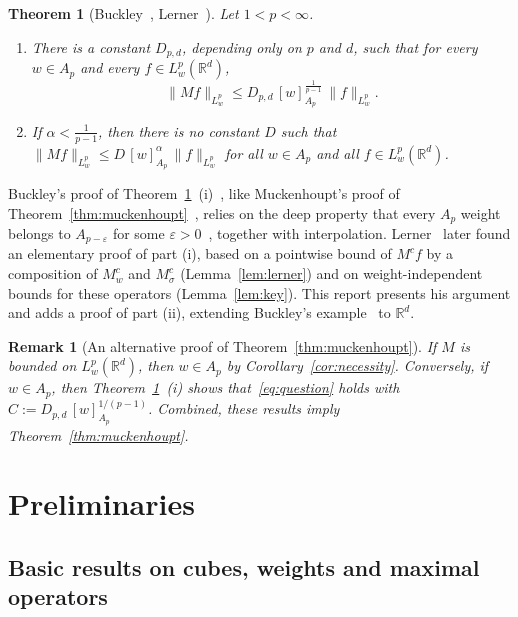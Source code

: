 \documentclass[12pt]{article}
\newtheorem{theorem}{Theorem}
\newtheorem{remark}{Remark}
\begin{document}
\begin{theorem}[{Buckley~\cite[Theorem~2.5]{Buckley1993}, Lerner~\cite[Theorem~C]{Lerner2008}}]\label{thm:main}
Let $1 < p < \infty$.
\begin{enumerate}[label=(\roman*)]
  \item There is a constant $D_{p,d}$, depending only on $p$ and $d$, such that for every $w \in A_p$ and every $f \in L^p_w(\mathbb{R}^d)$,
  \[
    \|Mf\|_{L^p_w} \le D_{p,d}\, [w]_{A_p}^{\frac{1}{p-1}}\, \|f\|_{L^p_w} .
  \]
  \item If $\alpha < \frac{1}{p-1}$, then there is no constant $D$ such that $\|Mf\|_{L^p_w} \le D\, [w]_{A_p}^{\alpha}\, \|f\|_{L^p_w}$ for all $w \in A_p$ and all $f \in L^p_w(\mathbb{R}^d)$.
\end{enumerate}
\end{theorem}

Buckley's proof of Theorem~\ref{thm:main}~(i)~\cite[proof of Theorem~2.5]{Buckley1993}, like Muckenhoupt's proof of Theorem~\ref{thm:muckenhoupt}~\cite[Lemma~5 and proof of Theorem~9]{Muckenhoupt1972}, relies on the deep property that every $A_p$ weight belongs to $A_{p-\varepsilon}$ for some $\varepsilon > 0$~\cite[Theorem~4.5]{Duoandikoetxea2013}, together with interpolation. Lerner~\cite[Theorem~C]{Lerner2008} later found an elementary proof of part (i), based on a pointwise bound of $M^c f$ by a composition of $M^c_w$ and $M^c_\sigma$ (Lemma~\ref{lem:lerner}) and on weight-independent bounds for these operators (Lemma~\ref{lem:key}). This report presents his argument and adds a proof of part (ii), extending Buckley's example~\cite[proof of Theorem~2.5]{Buckley1993} to $\mathbb{R}^d$.
\begin{remark}[An alternative proof of Theorem~\ref{thm:muckenhoupt}]
If $M$ is bounded on $L^p_w(\mathbb{R}^d)$, then $w \in A_p$ by Corollary~\ref{cor:necessity}. Conversely, if $w \in A_p$, then Theorem~\ref{thm:main}~(i) shows that~\eqref{eq:question} holds with $C := D_{p,d}\, [w]_{A_p}^{1/(p-1)}$. Combined, these results imply Theorem~\ref{thm:muckenhoupt}.
\end{remark}

\section{Preliminaries}\label{sec:prelim}

\subsection{Basic results on cubes, weights and maximal operators}\label{sec:cubes}
\end{document}
